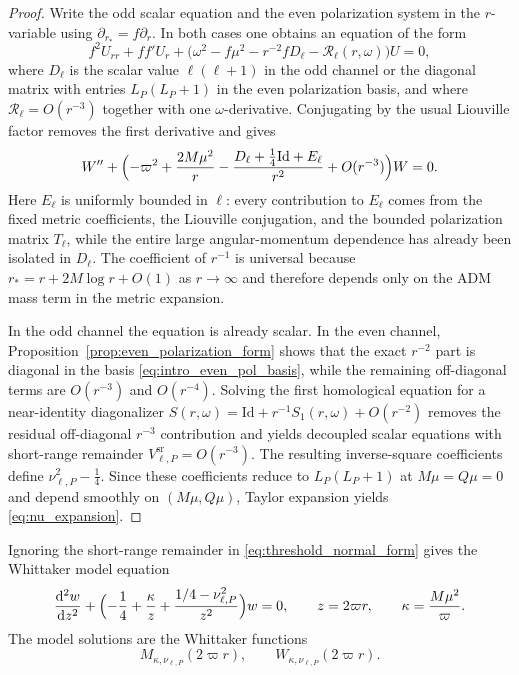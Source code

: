 \documentclass[12pt]{article}
\numberwithin{equation}{section}
\theoremstyle{plain}
\theoremstyle{definition}
\theoremstyle{remark}
\newcommand{\dd}{\mathrm d}
\newcommand{\vp}{\varpi}
\newcommand{\kap}{\kappa}
\newcommand{\Id}{\mathrm{Id}}
\begin{document}
\begin{proof}
Write the odd scalar equation and the even polarization system in the $r$-variable using $\partial_{r_*}=f\partial_r$.  In both cases one obtains an equation of the form
\[
   f^2U_{rr}+ff' U_r+\bigl(\omega^2-f\mu^2-r^{-2}fD_\ell-\mathcal R_\ell(r,\omega)\bigr)U=0,
\]
where $D_\ell$ is the scalar value $\ell(\ell+1)$ in the odd channel or the diagonal matrix with entries $L_P(L_P+1)$ in the even polarization basis, and where $\mathcal R_\ell=O(r^{-3})$ together with one $\omega$-derivative.  Conjugating by the usual Liouville factor removes the first derivative and gives
\[
   W''+\Bigl(-\vp^2+\frac{2M\mu^2}{r}-\frac{D_\ell+\frac14\Id+E_\ell}{r^2}+O(r^{-3})\Bigr)W=0.
\]
Here $E_\ell$ is uniformly bounded in $\ell$: every contribution to $E_\ell$ comes from the fixed metric coefficients, the Liouville conjugation, and the bounded polarization matrix $T_\ell$, while the entire large angular-momentum dependence has already been isolated in $D_\ell$.
The coefficient of $r^{-1}$ is universal because $r_*=r+2M\log r+O(1)$ as $r\to\infty$ and therefore depends only on the ADM mass term in the metric expansion.

In the odd channel the equation is already scalar.  In the even channel, Proposition~\ref{prop:even_polarization_form} shows that the exact $r^{-2}$ part is diagonal in the basis \eqref{eq:intro_even_pol_basis}, while the remaining off-diagonal terms are $O(r^{-3})$ and $O(r^{-4})$.  Solving the first homological equation for a near-identity diagonalizer $S(r,\omega)=\Id+r^{-1}S_1(r,\omega)+O(r^{-2})$ removes the residual off-diagonal $r^{-3}$ contribution and yields decoupled scalar equations with short-range remainder $V_{\ell,P}^{\mathrm{sr}}=O(r^{-3})$.  The resulting inverse-square coefficients define $\nu_{\ell,P}^2-\tfrac14$.  Since these coefficients reduce to $L_P(L_P+1)$ at $M\mu=Q\mu=0$ and depend smoothly on $(M\mu,Q\mu)$, Taylor expansion yields \eqref{eq:nu_expansion}.
\end{proof}

Ignoring the short-range remainder in \eqref{eq:threshold_normal_form} gives the Whittaker model equation
\begin{equation}\label{eq:whittaker_equation}
   \frac{\dd^2 w}{\dd z^2}
   +
   \Bigl(
      -\frac14+\frac{\kap}{z}
      +\frac{1/4-\nu_{\ell,P}^2}{z^2}
   \Bigr)w
   =0,
   \qquad
   z=2\vp r,
   \qquad
   \kap=\frac{M\mu^2}{\vp}.
\end{equation}
The model solutions are the Whittaker functions
\begin{equation}\label{eq:whittaker_basis}
   M_{\kap,\nu_{\ell,P}}(2\vp r),
   \qquad
   W_{\kap,\nu_{\ell,P}}(2\vp r).
\end{equation}
\end{document}
